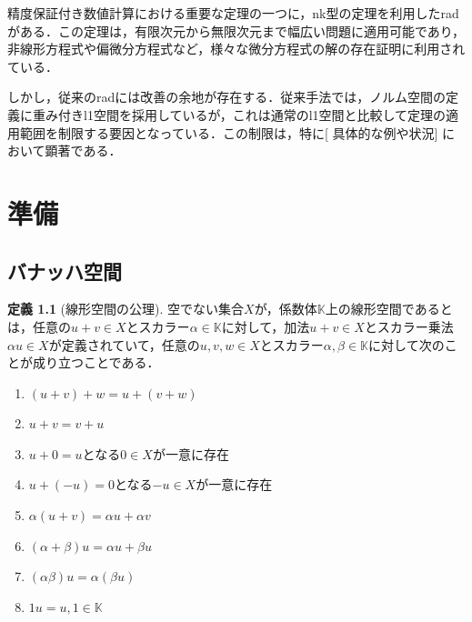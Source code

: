 \documentclass[11pt,a4paper,titlepage]{jsreport}
\theoremstyle{definition}
\newtheorem{dfn}{定義}
\providecommand{\DIFadd}[1]{{\protect\color{blue} \sf #1}} %
\providecommand{\DIFaddbegin}{} %
\providecommand{\DIFaddend}{} %
\providecommand{\DIFdelbegin}{} %
\providecommand{\DIFdelend}{} %
\newcommand{\DIFscaledelfig}{0.5}
\newlength{\DIFdelgraphicswidth} %
\newlength{\DIFdelgraphicsheight} %
\newcommand{\DIFaddincludegraphics}[2][]{{\color{blue}\fbox{\DIFOincludegraphics[#1]{#2}}}} %
\newcommand{\DIFdelincludegraphics}[2][]{%
\sbox{\DIFdelgraphicsbox}{\DIFOincludegraphics[#1]{#2}}%
\settoboxwidth{\DIFdelgraphicswidth}{\DIFdelgraphicsbox} %
\settoboxtotalheight{\DIFdelgraphicsheight}{\DIFdelgraphicsbox} %
\scalebox{\DIFscaledelfig}{%
\parbox[b]{\DIFdelgraphicswidth}{\usebox{\DIFdelgraphicsbox}\\[-\baselineskip] \rule{\DIFdelgraphicswidth}{0em}}\llap{\resizebox{\DIFdelgraphicswidth}{\DIFdelgraphicsheight}{%
\setlength{\unitlength}{\DIFdelgraphicswidth}%
\begin{picture}(1,1)%
\thicklines\linethickness{2pt} %
{\color[rgb]{1,0,0}\put(0,0){\framebox(1,1){}}}%
{\color[rgb]{1,0,0}\put(0,0){\line( 1,1){1}}}%
{\color[rgb]{1,0,0}\put(0,1){\line(1,-1){1}}}%
\end{picture}%
}\hspace*{3pt}}} %
} %
\DeclareRobustCommand{\DIFaddbegin}{\DIFOaddbegin \let\includegraphics\DIFaddincludegraphics} %
\DeclareRobustCommand{\DIFaddend}{\DIFOaddend \let\includegraphics\DIFOincludegraphics} %
\DeclareRobustCommand{\DIFdelbegin}{\DIFOdelbegin \let\includegraphics\DIFdelincludegraphics} %
\DeclareRobustCommand{\DIFdelend}{\DIFOaddend \let\includegraphics\DIFOincludegraphics} %
\begin{document}
\DIFdelbegin %
\DIFdelend \DIFaddbegin \hrulefill

\DIFadd{精度保証付き数値計算における重要な定理の一つに，nk型の定理を利用したradがある．この定理は，有限次元から無限次元まで幅広い問題に適用可能であり，非線形方程式や偏微分方程式など，様々な微分方程式の解の存在証明に利用されている．
}

\DIFadd{しかし，従来のradには改善の余地が存在する．従来手法では，ノルム空間の定義に重み付きl1空間を採用しているが，これは通常のl1空間と比較して定理の適用範囲を制限する要因となっている．この制限は，特に}[\DIFadd{具体的な例や状況}]\DIFadd{において顕著である．
}

\hrulefill
 \DIFaddend \newpage 
 \newpage 
\chapter{準備}
\section{バナッハ空間}
\begin{dfn}[線形空間の公理]
  \label{dfn:線形空間の公理}
  空でない集合$X$が，係数体$\mathbb{K}$上の線形空間であるとは，任意の$u+v \in X$とスカラー$\alpha \in \mathbb{K}$に対して，加法$u+v \in X$とスカラー乗法$\alpha u \in X$が定義されていて，任意の$u,v,w \in X$とスカラー$\alpha, \beta \in \mathbb{K}$に対して次のことが成り立つことである．
  \begin{enumerate}
    \item $(u+v)+w=u+(v+w)$
    \item $u+v=v+u$
    \item $u+0=u$となる$0 \in X$が一意に存在
    \item $u+(-u)=0$となる$-u\in X$が一意に存在
    \item $\alpha(u+v)=\alpha u+\alpha v$
    \item $(\alpha +\beta)u = \alpha u+\beta u$
    \item $(\alpha \beta)u = \alpha (\beta u)$
    \item $1u=u, 1 \in \mathbb{K}$
  \end{enumerate}
\end{dfn}
\end{document}
